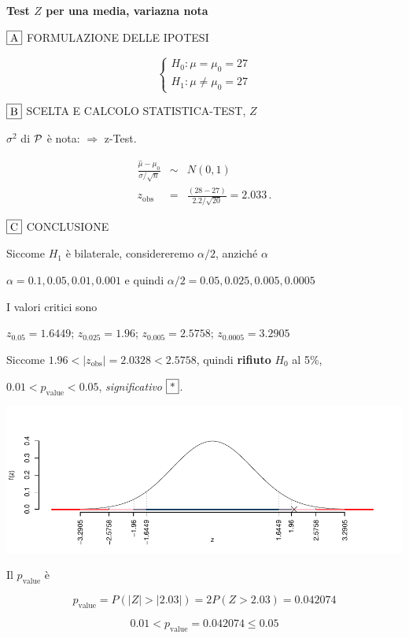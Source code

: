 \documentclass[
  11pt,
]{book}
\theoremstyle{mytheoremstyle}
\theoremstyle{mydefstyle}
\newenvironment{sol}
  {
  \begin{tcolorbox}[enhanced,breakable,arc=0.1mm,boxrule=1pt,colback=white,colframe=iblue,
  title=\bf \fontfamily{lmss}\selectfont \hspace{.5 cm} Soluzione,drop fuzzy shadow]

}{
\end{tcolorbox}
  }
\begin{document}
\begin{sol}
\textbf{Test \(Z\) per una media, variazna nota}

\(\fbox{A}\) FORMULAZIONE DELLE IPOTESI

\[\begin{cases}
   H_0: \mu = \mu_0=27 \\
   H_1: \mu \neq \mu_0=27 
   \end{cases}\]

\(\fbox{B}\) SCELTA E CALCOLO STATISTICA-TEST, \(Z\)

\(\sigma^{2}\) di \(\cal{P}\) è nota: \(\Rightarrow\) z-Test.

\begin{eqnarray*}
   \frac{\hat\mu - \mu_{0}} {\sigma/\sqrt{n}}&\sim&N(0,1)\\
   z_{\text{obs}}
   &=& \frac{ ( 28 -  27 )} { 2.2 /\sqrt{ 20 }}
   =   2.033 \, .
   \end{eqnarray*}

\(\fbox{C}\) CONCLUSIONE

Siccome \(H_1\) è bilaterale, considereremo \(\alpha/2\),
anziché \(\alpha\)

\(\alpha=0.1, 0.05, 0.01, 0.001\) e quindi \(\alpha/2=0.05, 0.025, 0.005, 0.0005\)

I valori critici sono

\(z_{0.05}=1.6449\); \(z_{0.025}=1.96\); \(z_{0.005}=2.5758\); \(z_{0.0005}=3.2905\)

Siccome \(1.96<|z_\text{obs}|=2.0328<2.5758\), quindi \textbf{rifiuto} \(H_0\) al 5\%,

\(0.01<p_\text{value}<0.05\), \emph{significativo} \(\fbox{*}\).

\begin{center}\includegraphics{Esami_passati_con_soluzioni_files/figure-latex/05-test-6,-1} \end{center}

Il \(p_{\text{value}}\) è

\[ p_{\text{value}} = P(|Z|>|2.03|)=2P(Z>2.03)=0.042074 \]

\[
 0.01 < p_\text{value}= 0.042074 \leq 0.05 
\]

\end{sol}
\end{document}
